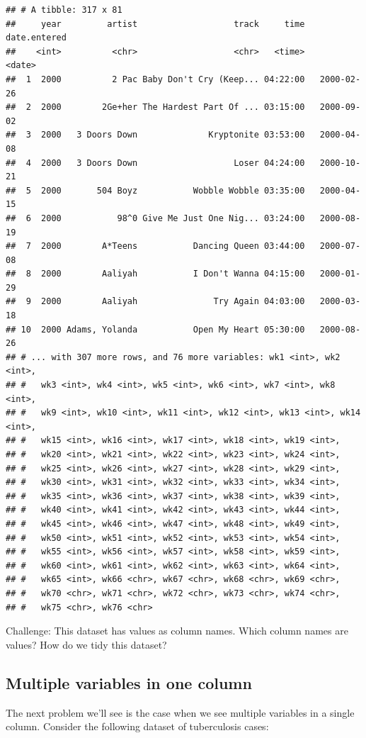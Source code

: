 \documentclass[12pt,]{book}
\theoremstyle{definition}
\theoremstyle{definition}
\theoremstyle{remark}
\begin{document}
\begin{verbatim}
## # A tibble: 317 x 81
##     year         artist                   track     time date.entered
##    <int>          <chr>                   <chr>   <time>       <date>
##  1  2000          2 Pac Baby Don't Cry (Keep... 04:22:00   2000-02-26
##  2  2000        2Ge+her The Hardest Part Of ... 03:15:00   2000-09-02
##  3  2000   3 Doors Down              Kryptonite 03:53:00   2000-04-08
##  4  2000   3 Doors Down                   Loser 04:24:00   2000-10-21
##  5  2000       504 Boyz           Wobble Wobble 03:35:00   2000-04-15
##  6  2000           98^0 Give Me Just One Nig... 03:24:00   2000-08-19
##  7  2000        A*Teens           Dancing Queen 03:44:00   2000-07-08
##  8  2000        Aaliyah           I Don't Wanna 04:15:00   2000-01-29
##  9  2000        Aaliyah               Try Again 04:03:00   2000-03-18
## 10  2000 Adams, Yolanda           Open My Heart 05:30:00   2000-08-26
## # ... with 307 more rows, and 76 more variables: wk1 <int>, wk2 <int>,
## #   wk3 <int>, wk4 <int>, wk5 <int>, wk6 <int>, wk7 <int>, wk8 <int>,
## #   wk9 <int>, wk10 <int>, wk11 <int>, wk12 <int>, wk13 <int>, wk14 <int>,
## #   wk15 <int>, wk16 <int>, wk17 <int>, wk18 <int>, wk19 <int>,
## #   wk20 <int>, wk21 <int>, wk22 <int>, wk23 <int>, wk24 <int>,
## #   wk25 <int>, wk26 <int>, wk27 <int>, wk28 <int>, wk29 <int>,
## #   wk30 <int>, wk31 <int>, wk32 <int>, wk33 <int>, wk34 <int>,
## #   wk35 <int>, wk36 <int>, wk37 <int>, wk38 <int>, wk39 <int>,
## #   wk40 <int>, wk41 <int>, wk42 <int>, wk43 <int>, wk44 <int>,
## #   wk45 <int>, wk46 <int>, wk47 <int>, wk48 <int>, wk49 <int>,
## #   wk50 <int>, wk51 <int>, wk52 <int>, wk53 <int>, wk54 <int>,
## #   wk55 <int>, wk56 <int>, wk57 <int>, wk58 <int>, wk59 <int>,
## #   wk60 <int>, wk61 <int>, wk62 <int>, wk63 <int>, wk64 <int>,
## #   wk65 <int>, wk66 <chr>, wk67 <chr>, wk68 <chr>, wk69 <chr>,
## #   wk70 <chr>, wk71 <chr>, wk72 <chr>, wk73 <chr>, wk74 <chr>,
## #   wk75 <chr>, wk76 <chr>
\end{verbatim}

Challenge: This dataset has values as column names. Which column names
are values? How do we tidy this dataset?

\subsection{Multiple variables in one
column}\label{multiple-variables-in-one-column}

The next problem we'll see is the case when we see multiple variables in
a single column. Consider the following dataset of tuberculosis cases:
\end{document}
